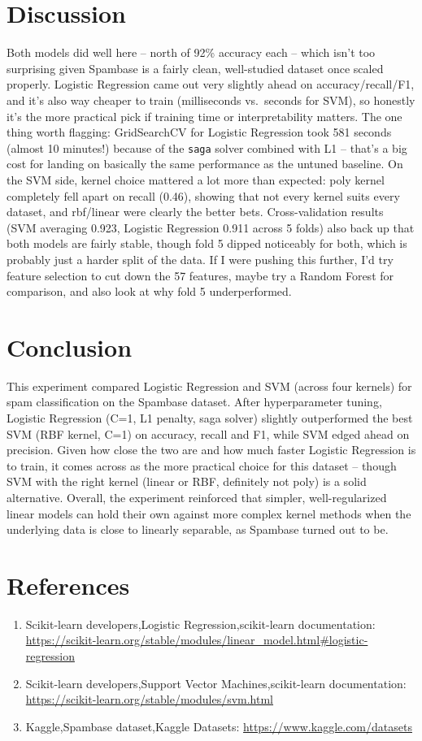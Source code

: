 \documentclass[12pt,a4paper]{article}
\begin{document}
\section{Discussion}
Both models did well here -- north of 92\% accuracy each -- which isn't too surprising given Spambase is a fairly clean, well-studied dataset once scaled properly. Logistic Regression came out very slightly ahead on accuracy/recall/F1, and it's also way cheaper to train (milliseconds vs.\ seconds for SVM), so honestly it's the more practical pick if training time or interpretability matters. The one thing worth flagging: GridSearchCV for Logistic Regression took 581 seconds (almost 10 minutes!) because of the \texttt{saga} solver combined with L1 -- that's a big cost for landing on basically the same performance as the untuned baseline. On the SVM side, kernel choice mattered a lot more than expected: poly kernel completely fell apart on recall (0.46), showing that not every kernel suits every dataset, and rbf/linear were clearly the better bets. Cross-validation results (SVM averaging 0.923, Logistic Regression 0.911 across 5 folds) also back up that both models are fairly stable, though fold 5 dipped noticeably for both, which is probably just a harder split of the data. If I were pushing this further, I'd try feature selection to cut down the 57 features, maybe try a Random Forest for comparison, and also look at why fold 5 underperformed.

\section{Conclusion}
This experiment compared Logistic Regression and SVM (across four kernels) for spam classification on the Spambase dataset. After hyperparameter tuning, Logistic Regression (C=1, L1 penalty, saga solver) slightly outperformed the best SVM (RBF kernel, C=1) on accuracy, recall and F1, while SVM edged ahead on precision. Given how close the two are and how much faster Logistic Regression is to train, it comes across as the more practical choice for this dataset -- though SVM with the right kernel (linear or RBF, definitely not poly) is a solid alternative. Overall, the experiment reinforced that simpler, well-regularized linear models can hold their own against more complex kernel methods when the underlying data is close to linearly separable, as Spambase turned out to be.

\section{References}
\begin{enumerate}
\item Scikit-learn developers,Logistic Regression,scikit-learn documentation: \url{https://scikit-learn.org/stable/modules/linear_model.html#logistic-regression}
\item Scikit-learn developers,Support Vector Machines,scikit-learn documentation: \url{https://scikit-learn.org/stable/modules/svm.html}
\item Kaggle,Spambase dataset,Kaggle Datasets: \url{https://www.kaggle.com/datasets}
\end{enumerate}
\end{document}
